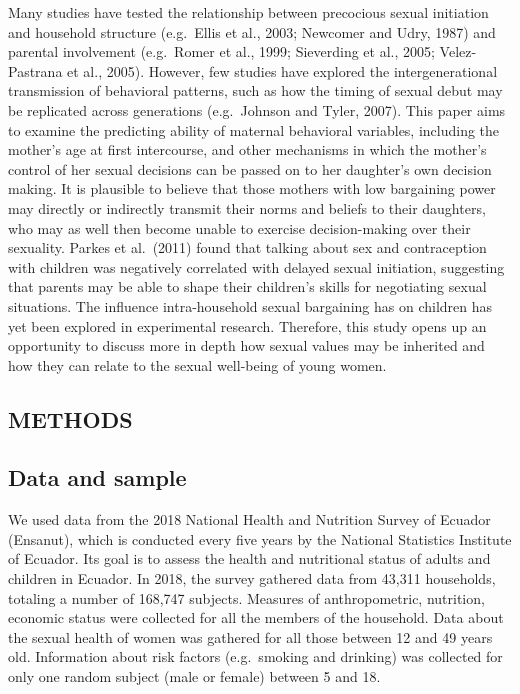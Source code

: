 \documentclass[
]{article}
\begin{document}
Many studies have tested the relationship between precocious sexual
initiation and household structure (e.g.~Ellis et al., 2003; Newcomer
and Udry, 1987) and parental involvement (e.g.~Romer et al., 1999;
Sieverding et al., 2005; Velez-Pastrana et al., 2005). However, few
studies have explored the intergenerational transmission of behavioral
patterns, such as how the timing of sexual debut may be replicated
across generations (e.g.~Johnson and Tyler, 2007). This paper aims to
examine the predicting ability of maternal behavioral variables,
including the mother's age at first intercourse, and other mechanisms in
which the mother's control of her sexual decisions can be passed on to
her daughter's own decision making. It is plausible to believe that
those mothers with low bargaining power may directly or indirectly
transmit their norms and beliefs to their daughters, who may as well
then become unable to exercise decision-making over their sexuality.
Parkes et al.~(2011) found that talking about sex and contraception with
children was negatively correlated with delayed sexual initiation,
suggesting that parents may be able to shape their children's skills for
negotiating sexual situations. The influence intra-household sexual
bargaining has on children has yet been explored in experimental
research. Therefore, this study opens up an opportunity to discuss more
in depth how sexual values may be inherited and how they can relate to
the sexual well-being of young women.

\hypertarget{methods}{%
\subsection{METHODS}\label{methods}}

\hypertarget{data-and-sample}{%
\subsection{Data and sample}\label{data-and-sample}}

We used data from the 2018 National Health and Nutrition Survey of
Ecuador (Ensanut), which is conducted every five years by the National
Statistics Institute of Ecuador. Its goal is to assess the health and
nutritional status of adults and children in Ecuador. In 2018, the
survey gathered data from 43,311 households, totaling a number of
168,747 subjects. Measures of anthropometric, nutrition, economic status
were collected for all the members of the household. Data about the
sexual health of women was gathered for all those between 12 and 49
years old. Information about risk factors (e.g.~smoking and drinking)
was collected for only one random subject (male or female) between 5 and
18.
\end{document}
